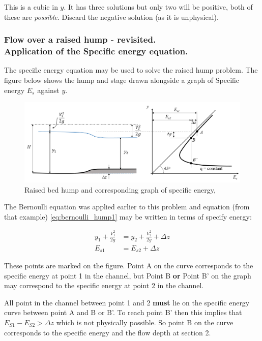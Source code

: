 \documentclass[a4paper, 12pt, british]{article} %
\numberwithin{equation}{section}
\numberwithin{figure}{section}
\numberwithin{table}{section}
\begin{document}
This is a cubic in $y$. It has three solutions but only two will be positive, both of these are \textit{possible}. Discard the negative solution (as it is unphysical).
 
\subsubsection{Flow over a raised hump - revisited. \\Application of the Specific energy equation.}

The specific energy equation may be used to solve the raised hump problem. The figure below shows the hump and stage drawn alongside a graph of Specific energy $E_s$ against $y$.

   \begin{figure}[H]
 	\centering
 	\includegraphics[scale=0.6]{./images/hump_2_Es_2018.png}
 	\caption{Raised bed hump and corresponding graph of specific energy, \cite{chadwick}}
 	\label{fig:194}
 \end{figure} 


The Bernoulli equation was applied earlier to this problem and equation (from that example) \ref{eq:bernoulli_hump1} may be written in terms of specify energy:

  \begin{align}
y_1  + \frac{  V_1^2}{2g}   &= y_2  + \frac{  V_2^2}{2g}  + \Delta z \nonumber \\
E_{s1} &= E_{s2} + \Delta z
\end{align}
 

These points are marked on the figure. Point A on the curve corresponds to the specific energy at point 1 in the channel, but Point B \textbf{or} Point B' on the graph may correspond to the specific energy at point 2 in the channel.

All point in the channel between point 1 and 2 \textbf{must}  lie on the specific energy curve between point A and B or B'. To reach point B' then this implies that $E_{S1} - E_{S2} > \Delta z$ which is not physically possible. So point B on the curve corresponds to the specific energy and the flow depth at section 2.
\end{document}
